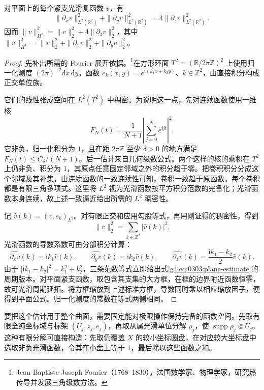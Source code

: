 \begin{lemma}
	\label{g4:lem:0303:plane-estimate}
	对平面上的每个紧支光滑复函数 \(v\)，有
	\begin{equation}
		\label{g4:eq:0303:plane-estimate}
		\|\partial_xv\|_{L^2(\mathbb R^2)}^2+
		\|\partial_yv\|_{L^2(\mathbb R^2)}^2
		=4\|\partial_{\overline z}v\|_{L^2(\mathbb R^2)}^2.
	\end{equation}
	因而 \(\|v\|_{H^1}^2=\|v\|_2^2+4\|\partial_{\overline z}v\|_2^2\)，其中 \(\|v\|_{H^1}^2=\|v\|_2^2+\|\partial_xv\|_2^2+\|\partial_yv\|_2^2\)。
\end{lemma}
\begin{proof}
	先补出所需的 Fourier 展开依据。\footnote{Jean Baptiste Joseph Fourier（1768--1830），法国数学家、物理学家，研究热传导并发展三角级数方法。}在方形环面 \(T^2=(\mathbb R/2\pi\mathbb Z)^2\) 上使用归一化测度 \((2\pi)^{-2}\mathrm{d}x\,\mathrm{d}y\)。函数 \(e_k(x,y)=e^{\mathrm{i}(k_1x+k_2y)}\)、\(k\in\mathbb Z^2\)，由直接积分构成正交单位族。

	它们的线性张成空间在 \(L^2(T^2)\) 中稠密。为说明这一点，先对连续函数使用一维核
	\[
		F_N(t)=\frac1{N+1}\left|\sum_{j=0}^N e^{\mathrm{i}jt}\right|^2.
	\]
	它非负，归一化积分为 \(1\)，且在距 \(2\pi\mathbb Z\) 至少 \(\delta>0\) 的地方满足 \(F_N(t)\le C_\delta/(N+1)\)。后一估计来自几何级数公式。两个这样的核的乘积在 \(T^2\) 上仍非负、积分为 \(1\)，其原点任意固定邻域之外的积分趋于零。把卷积积分分成这个邻域及其补集，由连续函数的一致连续性可知，卷积一致趋于原函数。每个卷积都是有限三角多项式。这里将 \(L^2\) 视为光滑函数按平方积分范数的完备化；光滑函数本身连续，故上述一致逼近给出所需的 \(L^2\) 稠密性。

	记 \(\widehat v(k)=(v,e_k)_{L^2}\)。对有限正交和应用勾股等式，再用刚证得的稠密性，得到
	\[
		\|v\|_2^2=\sum_{k\in\mathbb Z^2}|\widehat v(k)|^2.
	\]
	光滑函数的导数系数可由分部积分计算：
	\[
		\widehat{\partial_xv}(k)=\mathrm{i}k_1\widehat v(k),\qquad
		\widehat{\partial_yv}(k)=\mathrm{i}k_2\widehat v(k),\qquad
		\widehat{\partial_{\overline z}v}(k)
		=\frac{\mathrm{i}k_1-k_2}{2}\widehat v(k).
	\]
	由于 \(|\mathrm{i}k_1-k_2|^2=k_1^2+k_2^2\)，三条范数等式立即给出式\eqref{g4:eq:0303:plane-estimate}的周期版本。对平面紧支函数，取包含其支集的大方框，在框的边界附近函数恒零，故可光滑周期延拓。将方框缩放到上述标准方框，导数同时乘以相应缩放因子，便得到平面公式。归一化测度的常数在等式两侧相同。
\end{proof}

要把这个估计用于整个曲面，需要固定能对极限操作保持完备的函数空间。先取有限全纯坐标域与标架 \((U_j,z_j,e_j)\)，再取从属光滑单位分解 \(\rho_j\)，使 \(\operatorname{supp}\rho_j\Subset U_j\)。这种有限分解可直接构造：先取仍覆盖 \(X\) 的较小坐标圆盘，在对应较大坐标盘中选取非负光滑函数，令其在小盘上等于 \(1\)，最后除以这些函数之和。

